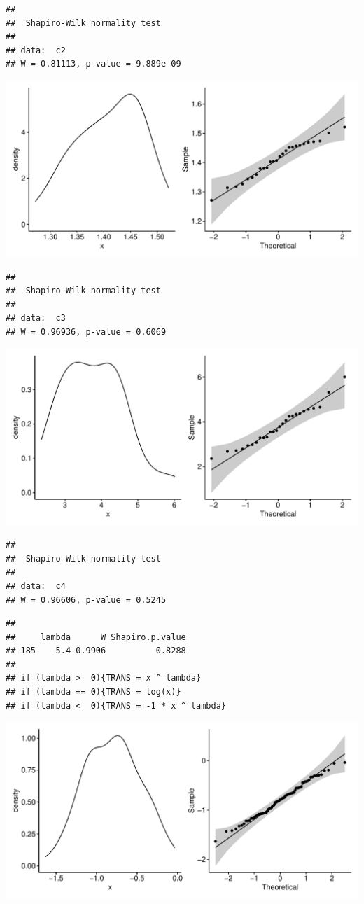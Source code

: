 \documentclass[
  11pt,
]{article}
\begin{document}
\begin{verbatim}
## 
##  Shapiro-Wilk normality test
## 
## data:  c2
## W = 0.81113, p-value = 9.889e-09
\end{verbatim}

\includegraphics{def_files/figure-latex/unnamed-chunk-19-3.pdf}

\begin{verbatim}
## 
##  Shapiro-Wilk normality test
## 
## data:  c3
## W = 0.96936, p-value = 0.6069
\end{verbatim}

\includegraphics{def_files/figure-latex/unnamed-chunk-19-4.pdf}

\begin{verbatim}
## 
##  Shapiro-Wilk normality test
## 
## data:  c4
## W = 0.96606, p-value = 0.5245
\end{verbatim}

\begin{verbatim}
## 
##     lambda      W Shapiro.p.value
## 185   -5.4 0.9906          0.8288
## 
## if (lambda >  0){TRANS = x ^ lambda} 
## if (lambda == 0){TRANS = log(x)} 
## if (lambda <  0){TRANS = -1 * x ^ lambda}
\end{verbatim}

\includegraphics{def_files/figure-latex/unnamed-chunk-19-5.pdf}
\end{document}
